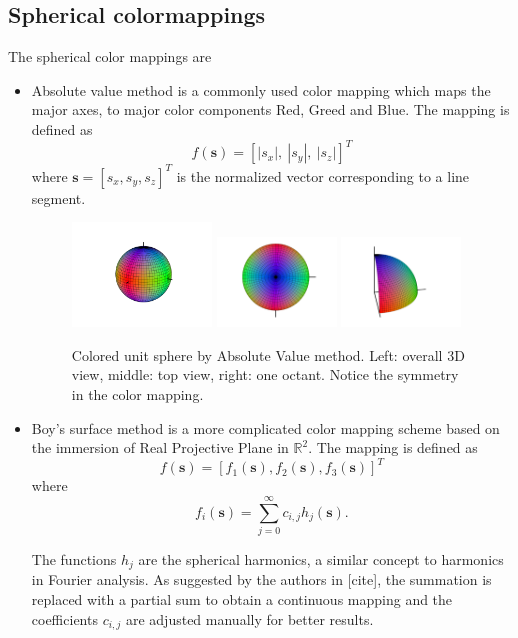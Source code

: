 \documentclass[hyperref, plainreport, noproblem]{cgvpub1}
\begin{document}
\subsection*{Spherical colormappings}
The spherical color mappings are
\begin{itemize}
	\item Absolute value method \cite{Pierpaoli1997OhNO} is a commonly used color mapping which maps the major axes, to major color components Red, Greed and Blue. The mapping is defined as 
	\begin{equation}
		f(\mathbf{s})=[|s_x|, \ |s_y|, \ |s_z|]^T
	\end{equation}
	where $\mathbf{s}=[s_x ,s_y, s_z]^T$ is the normalized vector corresponding to a line segment.  
	\begin{figure}
		\centering
		\includegraphics[width=0.35\textwidth]{absolute}
		\includegraphics[width=0.3\textwidth]{absolute_top}
		\includegraphics[width=0.3\textwidth]{absolute_octant}
		\caption{Colored unit sphere by Absolute Value method. Left: overall 3D view, middle: top view, right: one octant. Notice the symmetry in the color mapping.}
	\end{figure}
	
	\item Boy's surface method is a more complicated color mapping scheme based on the immersion of Real Projective Plane in $\mathbb{R}^2$. The mapping is defined as 
	\begin{equation}
		f(\mathbf{s})=[f_1(\mathbf{s}), f_2(\mathbf{s}), f_3(\mathbf{s})]^T
	\end{equation}
	where 
	\begin{equation}
		f_i(\mathbf{s})=\sum_{j=0}^{\infty} c_{i,j} h_j(\mathbf{s}).
	\end{equation}
	
The functions $h_j$ are the spherical harmonics, a similar concept to harmonics in Fourier analysis. As suggested by the authors in [cite], the summation is replaced with a partial sum to obtain a continuous mapping and the coefficients $c_{i,j}$ are adjusted manually for better results. 
\end{itemize}
\end{document}

